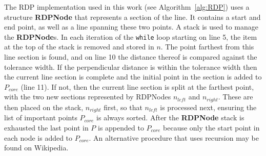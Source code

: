 The RDP implementation used in this work (see Algorithm~\ref{alg:RDP}) uses a structure \textbf{RDPNode} that represents a section of the line.
It contains a start and end point, as well as a line spanning these two points.
A stack is used to manage the \textbf{RDPNode}s.
In each iteration of the \verb|while| loop starting on line 5, the item at the top of the stack is removed and stored in $n$.
The point farthest from this line section is found, and on line 10 the distance thereof is compared against the tolerance width.
If the perpendicular distance is within the tolerance width then the current line section is complete and the initial point in the section is added to $P_{core}$ (line 11).
If not, then the current line section is split at the farthest point, with the two new sections represented by RDPNodes $n_{left}$ and $n_{right}$.
These are then placed on the stack, $n_{right}$ first, so that $n_{left}$ is processed next, ensuring the list of important points $P_{core}$ is always sorted.
After the \textbf{RDPNode} stack is exhausted the last point in $P$ is appended to $P_{core}$ because only the start point in each node is added to $P_{core}$.
An alternative procedure that uses recursion may be found on Wikipedia.

